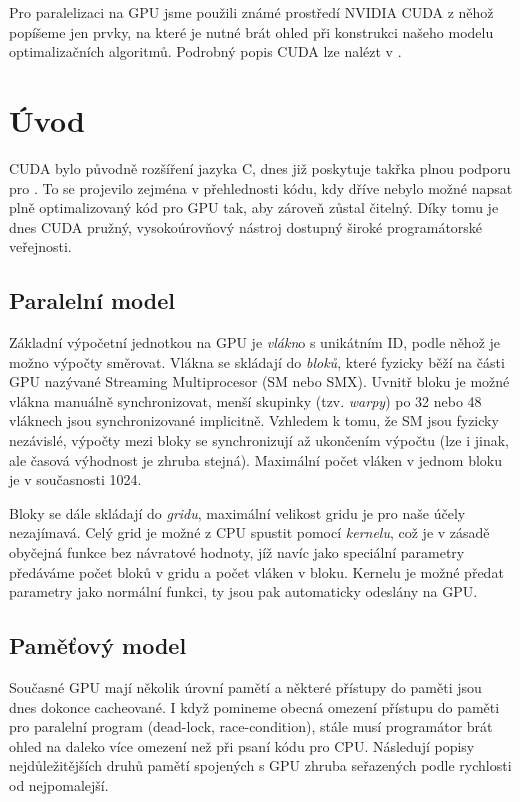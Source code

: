 
Pro paralelizaci na GPU jsme použili známé prostředí NVIDIA CUDA z něhož popíšeme jen prvky, na které je nutné brát ohled při konstrukci našeho modelu optimalizačních algoritmů. Podrobný popis CUDA lze nalézt v \cite{CUDA programming g.}.

\section{Úvod}

CUDA bylo původně rozšíření jazyka C, dnes již poskytuje takřka plnou podporu pro \Cpp. To se projevilo zejména v přehlednosti kódu, kdy dříve nebylo možné napsat plně optimalizovaný kód pro GPU tak, aby zároveň zůstal čitelný. Díky tomu je dnes CUDA pružný, vysokoúrovňový nástroj dostupný široké programátorské veřejnosti. 

\subsection{Paralelní model}

Základní výpočetní jednotkou na GPU je \emph{vlákn}o s unikátním ID, podle něhož je možno výpočty směrovat. Vlákna se skládají do \emph{bloků}, které fyzicky běží na části GPU nazývané Streaming Multiprocesor (SM nebo SMX). Uvnitř bloku je možné vlákna manuálně synchronizovat, menší skupinky (tzv. \emph{warpy}) po 32 nebo 48 vláknech jsou synchronizované implicitně. Vzhledem k tomu, že SM jsou fyzicky nezávislé, výpočty mezi bloky se synchronizují až ukončením výpočtu (lze i jinak, ale časová výhodnost je zhruba stejná). Maximální počet vláken v jednom bloku je v současnosti 1024.

Bloky se dále skládají do \emph{gridu}, maximální velikost gridu je pro naše účely nezajímavá. Celý grid je možné z CPU spustit pomocí \emph{kernelu}, což je v zásadě obyčejná funkce bez návratové hodnoty, jíž navíc jako speciální parametry předáváme počet bloků v gridu a počet vláken v bloku. Kernelu je možné předat parametry jako normální funkci, ty jsou pak automaticky odeslány na GPU.

\subsection{Paměťový model}

Současné GPU mají několik úrovní pamětí a některé přístupy do paměti jsou dnes dokonce cacheované. I když pomineme obecná omezení přístupu do paměti pro paralelní program (dead-lock, race-condition), stále musí programátor brát ohled na daleko více omezení než při psaní kódu pro CPU. Následují popisy nejdůležitějších druhů pamětí spojených s GPU zhruba seřazených podle rychlosti od nejpomalejší.

